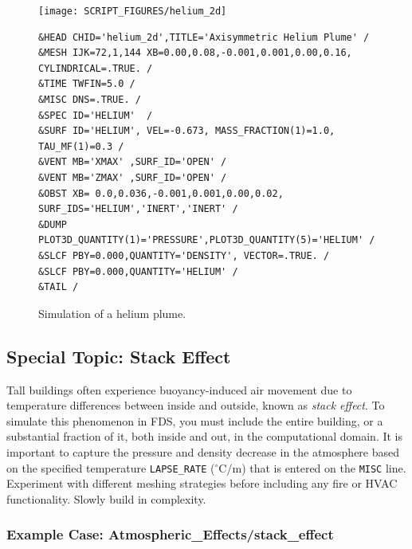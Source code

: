 \documentclass[11pt]{book}
\newcommand{\ct}{\tt\small}
\begin{document}
\begin{figure}[ht]
\scriptsize
\noindent
\begin{minipage}{1.1in}
\texttt{[image: SCRIPT\_FIGURES/helium\_2d]}
\end{minipage}
\hfill
\begin{minipage}{5.5in}
\begin{verbatim}
&HEAD CHID='helium_2d',TITLE='Axisymmetric Helium Plume' /
&MESH IJK=72,1,144 XB=0.00,0.08,-0.001,0.001,0.00,0.16, CYLINDRICAL=.TRUE. /
&TIME TWFIN=5.0 /
&MISC DNS=.TRUE. /
&SPEC ID='HELIUM'  /
&SURF ID='HELIUM', VEL=-0.673, MASS_FRACTION(1)=1.0, TAU_MF(1)=0.3 /
&VENT MB='XMAX' ,SURF_ID='OPEN' /
&VENT MB='ZMAX' ,SURF_ID='OPEN' /
&OBST XB= 0.0,0.036,-0.001,0.001,0.00,0.02, SURF_IDS='HELIUM','INERT','INERT' /
&DUMP PLOT3D_QUANTITY(1)='PRESSURE',PLOT3D_QUANTITY(5)='HELIUM' /
&SLCF PBY=0.000,QUANTITY='DENSITY', VECTOR=.TRUE. /
&SLCF PBY=0.000,QUANTITY='HELIUM' /
&TAIL /
\end{verbatim}
\end{minipage}
\normalsize
\caption[Axi-symmetric helium plume]{Simulation of a helium plume.}
\label{helium_plume}
\end{figure}







\subsection{Special Topic: Stack Effect}
\label{info:stackeffect}

Tall buildings often experience buoyancy-induced air movement due to temperature differences
between inside and outside, known as {\em stack effect}. To simulate this phenomenon in FDS, you must
include the entire building, or a substantial fraction of it, both inside and out, in the computational domain. It
is important to capture the pressure and density decrease in the atmosphere based on the specified
temperature {\ct LAPSE\_RATE} ($^\circ$C/m) that is entered on the {\ct MISC} line. Experiment with different meshing
strategies before including any fire or HVAC functionality. Slowly build in complexity.

\subsubsection{Example Case: Atmospheric\_Effects/stack\_effect}
\end{document}
